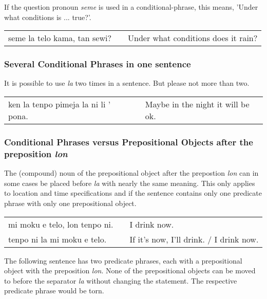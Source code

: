 If the question pronoun \textit{seme} is used in a conditional-phrase, this means, 'Under what conditions is ... true?'.

\begin{supertabular}{p{5,5cm}|ll}
seme la telo kama, tan sewi? && Under what conditions does it rain? \\  
\end{supertabular} 

%
%
\subsubsection*{Several Conditional Phrases in one sentence}
%
%
It is possible to use \textit{la} two times in a sentence. 
But please not more than two. 

\begin{supertabular}{p{5,5cm}|ll}
ken la tenpo pimeja la ni li ' pona. && Maybe in the night it will be ok. \\  
\end{supertabular} 

%
%
\subsubsection*{Conditional Phrases versus Prepositional Objects after the preposition \textit{lon} }
%
The (compound) noun of the prepositional object after the prepostion \textit{lon} can in some cases be placed before \textit{la} with nearly the same meaning.
This only applies to location and time specifications and if the sentence contains only one predicate phrase with only one prepositional object. 

\begin{supertabular}{p{5,5cm}|ll}
mi moku e telo, lon tenpo ni. && I drink now. \\
tenpo ni la mi moku e telo.  && If it's now, I'll drink. / I drink now. \\
\end{supertabular} 

The following sentence has two predicate phrases, each with a prepositional object with the preposition \textit{lon}. 
None of the prepositional objects can be moved to before the separator \textit{la} without changing the statement. 
The respective predicate phrase would be torn.

